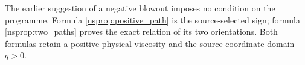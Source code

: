The earlier suggestion of a negative blowout imposes no condition on
the programme. Formula \eqref{nsprop:positive_path} is the source-selected
sign; formula \eqref{nsprop:two_paths} proves the exact relation of its
two orientations. Both formulas retain a positive physical viscosity
and the source coordinate domain $q>0$.
